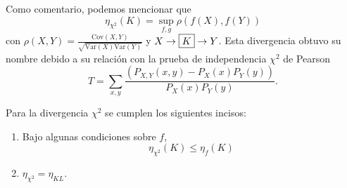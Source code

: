\begin{observation}
 Como comentario, podemos mencionar que
 \begin{equation*}
     \eta_{\chi^2}(K)=\sup_{f,g}\rho(f(X),f(Y))
 \end{equation*}
 con $\rho(X,Y)=\frac{\text{Cov}(X,Y)}{\sqrt{\text{Var}(X)\text{Var}(Y)}}$ y $X\to\fbox{$K$}\to Y$. Esta divergencia obtuvo su nombre debido a su relaci\'on con la prueba de independencia $\chi^2$ de Pearson
 \begin{equation*}
     T=\sum_{x,y}\frac{(P_{X,Y}(x,y)-P_X(x)P_Y(y))}{P_X(x)P_Y(y)}.
 \end{equation*}
\end{observation}

\begin{theorem}
Para la divergencia $\chi^2$ se cumplen los siguientes incisos:
\begin{enumerate}[label=(\alph*)]
    \item Bajo algunas condiciones sobre $f$,
    \begin{equation*}
        \eta_{\chi^2}(K)\leq\eta_{f}(K)
    \end{equation*}
    \item $\eta_{\chi^2}=\eta_{KL}$.
\end{enumerate}
\end{theorem}